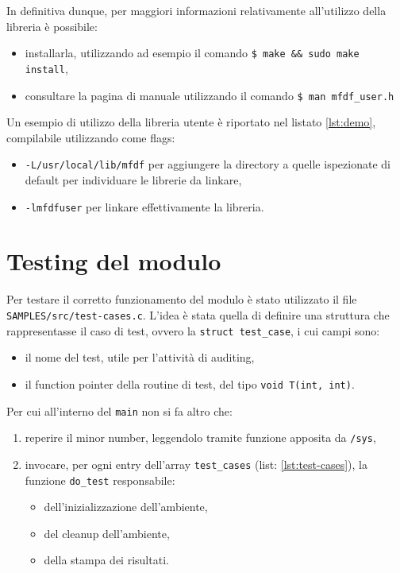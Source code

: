 \documentclass{article}
\newcommand{\terminal}[1]{\colorbox{tn-bg}{\textcolor{tn-fg}{\texttt{#1}}}}
\begin{document}
In definitiva dunque, per maggiori informazioni relativamente all'utilizzo della libreria è possibile:
\begin{itemize}
        \item installarla, utilizzando ad esempio il comando \terminal{\$ make \&\& sudo make install},
        \item consultare la pagina di manuale utilizzando il comando \terminal{\$ man mfdf\_user.h}
\end{itemize}

Un esempio di utilizzo della libreria utente è riportato nel listato \ref{lst:demo}, compilabile utilizzando come flags:
\begin{itemize}
        \item \texttt{-L/usr/local/lib/mfdf} per aggiungere la directory a quelle ispezionate di default per individuare le librerie da linkare,
        \item \texttt{-lmfdfuser} per linkare effettivamente la libreria.
\end{itemize}

\section{Testing del modulo}
Per testare il corretto funzionamento del modulo è stato utilizzato il file \texttt{SAMPLES/src/test-cases.c}. L'idea è stata quella di definire una struttura che rappresentasse il caso di test, ovvero la \texttt{struct test\_case}, i cui campi sono:
\begin{itemize}
        \item il nome del test, utile per l'attività di auditing,
        \item il function pointer della routine di test, del tipo \texttt{void T(int, int)}.
\end{itemize}

Per cui all'interno del \texttt{main} non si fa altro che:
\begin{enumerate}
        \item reperire il minor number, leggendolo tramite funzione apposita da \texttt{/sys},
        \item invocare, per ogni entry dell'array \texttt{test\_cases} (list: \ref{lst:test-cases}), la funzione \texttt{do\_test} responsabile:
                \begin{itemize}
                        \item dell'inizializzazione dell'ambiente,
                        \item del cleanup dell'ambiente,
                        \item della stampa dei risultati.
                \end{itemize}
\end{enumerate}
\end{document}
